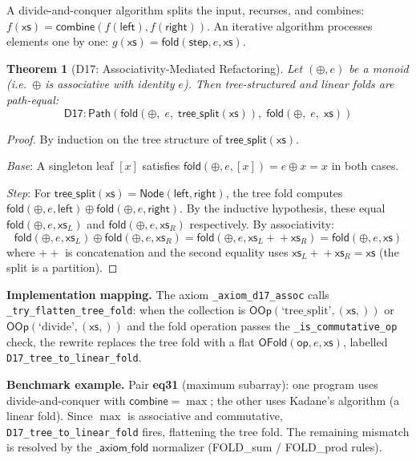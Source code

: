 \documentclass[11pt,a4paper]{report}
\theoremstyle{definition}
\theoremstyle{plain}
\newtheorem{theorem}[definition]{Theorem}
\newcommand{\Path}{\mathsf{Path}}
\newcommand{\fold}{\mathsf{fold}}
\newcommand{\op}{\mathsf{op}}
\begin{document}
A divide-and-conquer algorithm splits the input, recurses, and
combines:
$f(\mathsf{xs}) = \mathsf{combine}(f(\mathsf{left}),
f(\mathsf{right}))$.
An iterative algorithm processes elements one by one:
$g(\mathsf{xs}) = \fold(\mathsf{step}, e, \mathsf{xs})$.

\begin{theorem}[D17: Associativity-Mediated Refactoring]
\label{thm:d17-assoc}
Let $(\oplus, e)$ be a monoid (i.e.\ $\oplus$ is associative with
identity $e$).  Then tree-structured and linear folds are path-equal:
\[
  \mathsf{D17} : \Path\!\left(
    \fold(\oplus,\; e,\; \mathsf{tree\_split}(\mathsf{xs})),\;
    \fold(\oplus,\; e,\; \mathsf{xs})
  \right)
\]
\end{theorem}

\begin{proof}
By induction on the tree structure of $\mathsf{tree\_split}(\mathsf{xs})$.

\emph{Base}: A singleton leaf $[x]$ satisfies
$\fold(\oplus, e, [x]) = e \oplus x = x$ in both cases.

\emph{Step}: For $\mathsf{tree\_split}(\mathsf{xs}) =
\mathsf{Node}(\mathsf{left}, \mathsf{right})$, the tree fold computes
$\fold(\oplus, e, \mathsf{left}) \oplus
\fold(\oplus, e, \mathsf{right})$.  By the inductive hypothesis,
these equal $\fold(\oplus, e, \mathsf{xs}_L)$ and
$\fold(\oplus, e, \mathsf{xs}_R)$ respectively.  By associativity:
\[
  \fold(\oplus, e, \mathsf{xs}_L) \oplus \fold(\oplus, e, \mathsf{xs}_R)
  = \fold(\oplus, e, \mathsf{xs}_L +\!\!+ \mathsf{xs}_R)
  = \fold(\oplus, e, \mathsf{xs})
\]
where $+\!\!+$ is concatenation and the second equality uses
$\mathsf{xs}_L +\!\!+ \mathsf{xs}_R = \mathsf{xs}$ (the split
is a partition).
\end{proof}

\textbf{Implementation mapping.}
The axiom \texttt{\_axiom\_d17\_assoc} calls
\texttt{\_try\_flatten\_tree\_fold}: when the collection is
$\mathsf{OOp}(\text{`tree\_split'}, (\mathsf{xs},))$ or
$\mathsf{OOp}(\text{`divide'}, (\mathsf{xs},))$ and the fold
operation passes the \texttt{\_is\_commutative\_op} check, the
rewrite replaces the tree fold with a flat
$\mathsf{OFold}(\op, e, \mathsf{xs})$, labelled
\texttt{D17\_tree\_to\_linear\_fold}.

\textbf{Benchmark example.}
Pair \textbf{eq31} (maximum subarray): one program uses
divide-and-conquer with $\mathsf{combine} = \max$; the other uses
Kadane's algorithm (a linear fold).  Since $\max$ is associative and
commutative, \texttt{D17\_tree\_to\_linear\_fold} fires, flattening
the tree fold.  The remaining mismatch is resolved by the
$\mathsf{\_axiom\_fold}$ normalizer (FOLD\_sum / FOLD\_prod rules).
\end{document}

